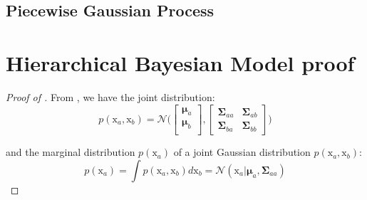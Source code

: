 \documentclass{article}
\begin{document}
\subsection{Piecewise Gaussian Process}


\FloatBarrier




\appendix
\section{Hierarchical Bayesian Model proof}

\begin{proof}[Proof of ]\label{proof:HBM}
From \citep{deisenroth2020mathematics}, we have the joint distribution:
\begin{equation}
  p(\bm{\mathrm{x}}_{a}, \bm{\mathrm{x}}_{b}) = \mathcal{N}\Bigg(
  \begin{bmatrix}
    \bm{\mu}_{a} \\
    \bm{\mu}_{b} \\
  \end{bmatrix},
  \begin{bmatrix}
    \bm{\Sigma}_{aa} & \bm{\Sigma}_{ab}  \\
    \bm{\Sigma}_{ba} & \bm{\Sigma}_{bb}
  \end{bmatrix}
  \Bigg)\label{eq:joint-distrib}
\end{equation}

and the marginal distribution $p(\bm{\mathrm{x}}_{a})$ of a joint Gaussian distribution $p(\bm{\mathrm{x}}_{a}, \bm{\mathrm{x}}_{b})$:
\begin{equation}
  p(\bm{\mathrm{x}}_{a}) = \int p(\bm{\mathrm{x}}_{a}, \bm{\mathrm{x}}_{b}) d \bm{\mathrm{x}}_{b} = \mathcal{N}( \bm{\mathrm{x}}_{a} | \bm{\mu}_{a}, \bm{\Sigma}_{aa})
\end{equation}


\end{proof}
\end{document}
